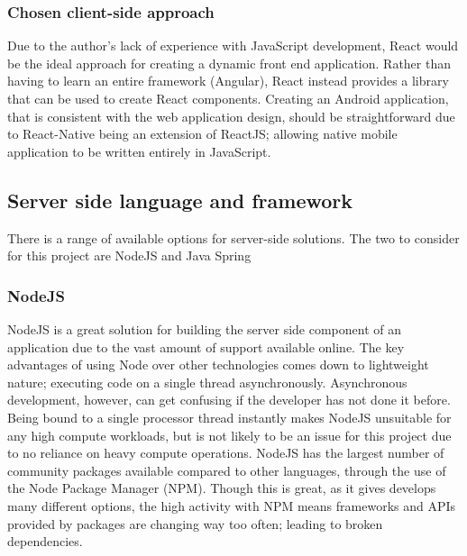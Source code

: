 \subsubsection*{Chosen client-side approach} \label{chosenclientside}
Due to the author's lack of experience with JavaScript development, React would be the ideal approach for creating a dynamic front end application.
Rather than having to learn an entire framework (Angular), React instead provides a library that can be used to create React components.
Creating an Android application, that is consistent with the web application design, should be straightforward due to React-Native
being an extension of ReactJS; allowing native mobile application to be written entirely in JavaScript.


\subsection{Server side language and framework}
There is a range of available options for server-side solutions.
The two to consider for this project are NodeJS and Java Spring 

\subsubsection*{NodeJS}
NodeJS is a great solution for building the server side component of an application due to the vast amount of support available online.
The key advantages of using Node over other technologies comes down to lightweight nature; executing code on a single thread asynchronously.
Asynchronous development, however, can get confusing if the developer has not done it before.
Being bound to a single processor thread instantly makes NodeJS unsuitable for any high compute workloads, but is not likely to be an 
issue for this project due to no reliance on heavy compute operations.
NodeJS has the largest number of community packages available compared to other languages, through the use of the Node Package Manager (NPM).
Though this is great, as it gives develops many different options, the high activity with NPM means frameworks and APIs provided by packages
are changing way too often; leading to broken dependencies.

